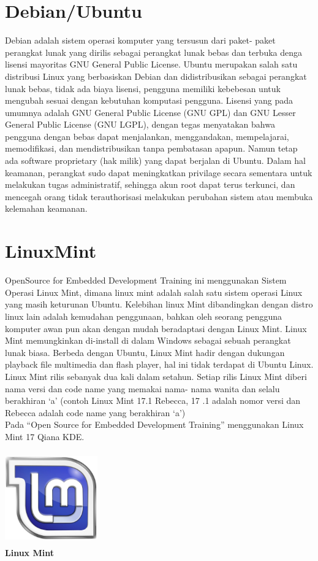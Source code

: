 \documentclass[11pt,fleqn]{book} %
\begin{document}
\section{Debian/Ubuntu}
\hspace{10pt} Debian adalah sistem operasi komputer yang tersusun dari paket- paket perangkat lunak yang dirilis sebagai perangkat lunak bebas dan terbuka denga lisensi mayoritas GNU General Public License. 
Ubuntu merupakan salah satu distribusi Linux yang berbasiskan Debian dan didistribusikan sebagai perangkat lunak bebas, tidak ada biaya lisensi, pengguna memiliki kebebesan untuk mengubah sesuai dengan kebutuhan komputasi pengguna. 
Lisensi yang pada umumnya adalah GNU General Public License (GNU GPL) dan GNU Lesser General Public License (GNU LGPL), dengan tegas menyatakan bahwa pengguna dengan bebas dapat menjalankan, menggandakan, mempelajarai, memodifikasi, dan mendistribusikan tanpa pembatasan apapun. Namun tetap ada software proprietary (hak milik) yang dapat berjalan di Ubuntu. 
Dalam hal keamanan, perangkat sudo dapat meningkatkan privilage secara sementara untuk melakukan tugas administratif, sehingga akun root dapat terus terkunci, dan mencegah orang tidak terauthorisasi melakukan perubahan sistem atau membuka kelemahan keamanan. 
\section{LinuxMint}
\hspace{10pt} OpenSource for Embedded Development Training ini menggunakan Sistem Operasi Linux Mint, dimana linux mint adalah salah satu sistem operasi Linux yang masih keturunan Ubuntu. 
Kelebihan linux Mint dibandingkan dengan distro linux lain adalah kemudahan penggunaan, bahkan oleh seorang pengguna komputer awan pun akan dengan mudah beradaptasi dengan Linux Mint. 
Linux Mint memungkinkan di-install di dalam Windows sebagai sebuah perangkat lunak biasa. 
Berbeda dengan Ubuntu, Linux Mint hadir dengan dukungan playback file multimedia dan flash player, hal ini tidak terdapat di Ubuntu Linux. 
Linux Mint rilis sebanyak dua kali dalam setahun. Setiap rilis Linux Mint diberi nama versi dan code name yang memakai nama- nama wanita dan selalu berakhiran ‘a’ (contoh Linux Mint 17.1 Rebecca, 17 .1 adalah nomor versi dan Rebecca adalah code name yang berakhiran ‘a’)\\
Pada “Open Source for Embedded Development Training” menggunakan Linux Mint 17 Qiana KDE.\\
\begin{center}
\includegraphics[width=4cm,height=4cm]{MINT1.jpg}\\
  \textbf{Linux Mint}
\end{center}
\end{document}
